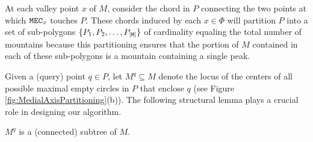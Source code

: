 \documentclass[12pt]{llncs}
\begin{document}
At each valley point $x$ of $M$, consider the chord in $P$ connecting the two points 
at which ${\tt MEC}_x$ touches $P$. These chords induced by each $x \in \Phi$ will 
partition $P$ into  a set of sub-polygons $\{P_1,P_2, \ldots, P_{|{\tt M}|}\}$ of 
cardinality equaling the total number of mountains because this 
partitioning ensures that the portion of $M$  contained in each of these sub-polygons 
is a 
mountain containing a single peak. 

Given a (query) point $q\in P$, let $M^q\subseteq M$ denote the locus of the 
centers of all possible maximal empty circles in $P$ that enclose $q$ (see 
Figure \ref{fig:MedialAxisPartitioning}(b)). The following structural lemma 
plays a crucial role in designing our algorithm. 
\begin{lemma} \label{l1}
$M^q$ is a (connected) subtree of $M$.
\end{lemma}
\end{document}
